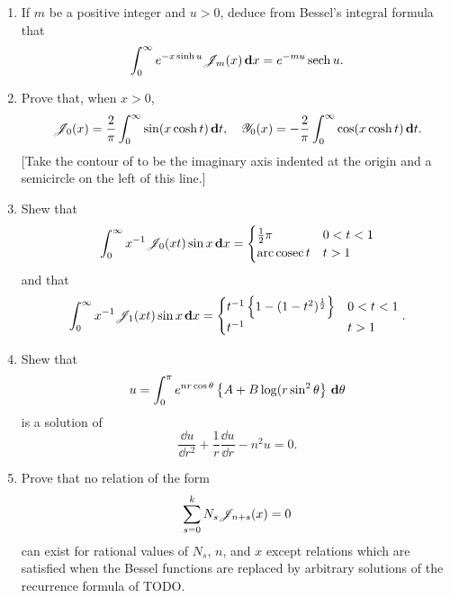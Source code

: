 \begin{enumerate}
\item
  If $m$ be a positive integer and $u>0$, deduce from Bessel's
  integral formula that
  $$
  \int_{0}^{\infty}
  e^{-x \sinh u} \mathscr{J}_{m}(x) \, \mathbf{d} x
  =
  e^{-mu} \operatorname{sech} u.
  $$
\item
  Prove that, when $x>0$,
  $$
  \mathscr{J}_{0}(x) = \frac{2}{\pi} \int_{0}^{\infty} \sin(x \cosh t)
  \, \mathbf{d} t,
  \quad
  \mathscr{Y}_{0}(x) = -\frac{2}{\pi}
  \int_{0}^{\infty} \cos(x \cosh t)
  \, \mathbf{d} t.
  $$
  [Take the contour of  to be the imaginary axis
  indented at the origin and a semicircle on the left of this line.]
\item
  Shew that
  $$
  \int_{0}^{\infty} x^{-1} \mathscr{J}_{0}(xt) \sin x \, \mathbf{d} x
  =
  \begin{cases}
    \frac{1}{2}\pi & 0 < t < 1
    \\
    \operatorname{arc\,cosec} t & t > 1
  \end{cases}
  $$
  and that
  $$
  \int_{0}^{\infty} x^{-1} \mathscr{J}_{1}(xt) \sin x \, \mathbf{d} x
  =
  \begin{cases}
    t^{-1} \left\{  1 - (1-t^{2})^{\frac{1}{2}}   \right\} & 0 < t < 1
    \\
    t^{-1} & t > 1
  \end{cases}.
  $$
\item
  Shew that
  $$
  u = \int_{0}^{\pi} e^{nr\cos\theta} \left\{ A + B \log(r\sin^{2}\theta \right\} \, \mathbf{d} \theta
  $$
  is a solution of
  $$
  \frac{\dd u}{\dd r^{2}} + \frac{1}{r} \frac{\dd u}{\dd r} - n^{2} u
  = 0.
  $$
\item
  Prove that no relation of the form
  $$
  \sum_{s=0}^{k} N_{s} \mathscr{J}_{n+s}(x) = 0
  $$
  can exist for rational values of $N_{s}$, $n$, and $x$ except
  relations which are satisfied when the Bessel functions are replaced
  by arbitrary solutions of the recurrence formula of TODO.


\end{enumerate}
